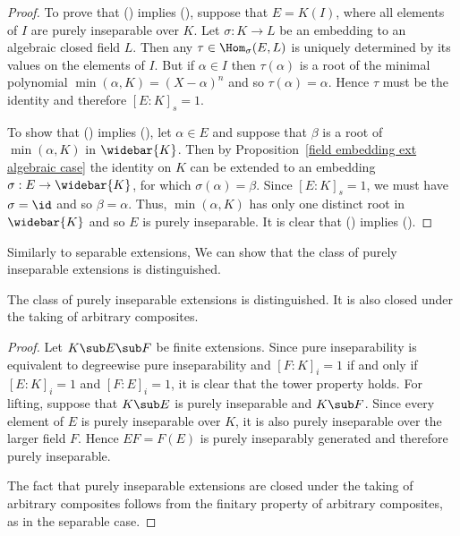 \begin{proof}
To prove that () implies (), suppose that $E=K(I)$, where all elements of $I$ are purely inseparable over $K$. Let $\sigma:K\to L$ be an embedding to an algebraic closed field $L$. Then any $\tau\in\Hom_\sigma(E,L)$ is uniquely determined by its values on the elements of $I$. But if $\alpha\in I$ then $\tau(\alpha)$ is a root of the minimal polynomial $\min(\alpha,K)=(X-\alpha)^n$ and so $\tau(\alpha)=\alpha$. Hence $\tau$ must be the identity and therefore $[E:K]_s=1$.\par
To show that () implies (), let $\alpha\in E$ and suppose that $\beta$ is a root of $\min(\alpha,K)$ in $\widebar{K}$. Then by Proposition~\ref{field embedding ext algebraic case} the identity on $K$ can be extended to an embedding $\sigma:E\to\widebar{K}$, for which $\sigma(\alpha)=\beta$. Since $[E:K]_s=1$, we must have $\sigma=\id$ and so $\beta=\alpha$. Thus, $\min(\alpha,K)$ has only one distinct root in $\widebar{K}$ and so $E$ is purely inseparable. It is clear that () implies ().
\end{proof}
Similarly to separable extensions, We can show that the class of purely inseparable extensions is distinguished.
\begin{proposition}
The class of purely inseparable extensions is distinguished. It is
also closed under the taking of arbitrary composites.
\end{proposition}
\begin{proof}
Let $K\sub E\sub F$ be finite extensions. Since pure inseparability is equivalent to degreewise pure inseparability and $[F:K]_i=1$ if and only if $[E:K]_i=1$ and $[F:E]_i=1$, it is clear that the tower property holds. For lifting, suppose that $K\sub E$ is purely inseparable and $K\sub F$. Since every element of $E$ is purely inseparable over $K$, it is also purely inseparable over the larger field $F$. Hence $EF=F(E)$ is purely inseparably generated and therefore purely inseparable.\par
The fact that purely inseparable extensions are closed under the taking of arbitrary composites follows from the finitary property of arbitrary composites, as in the separable case.
\end{proof}
